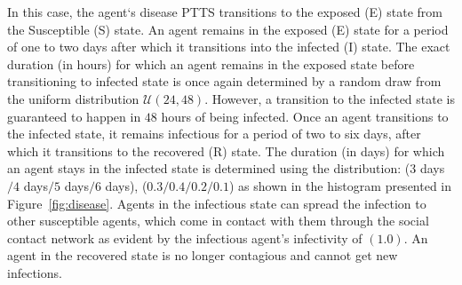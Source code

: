\documentclass[doublespace]{VTthesis}
\begin{document}
    In this case, the agent`s disease PTTS transitions to the exposed (E) state from the Susceptible (S) state. An agent remains in the exposed (E) state for a period of one to two days after which it transitions into the infected (I) state. The exact duration (in hours) for which an agent remains in the exposed state before transitioning to infected state is once again determined by a random draw from the uniform distribution $\mathcal{U}(24,48)$. However, a transition to the infected state is guaranteed to happen in $48$ hours of being infected. Once an agent transitions to the infected state, it remains infectious for a period of two to six days, after which it transitions to the recovered (R) state. The duration (in days) for which an agent stays in the infected state is determined using the distribution: ($3$ days$/4$ days$/5$ days$/6$ days), ($0.3/0.4/0.2/0.1$) as shown in the histogram presented in Figure~\ref{fig:disease}. Agents in the infectious state can spread the infection to other susceptible agents, which come in contact with them through the social contact network as evident by the infectious agent's infectivity of $(1.0)$. An agent in the recovered state is no longer contagious and cannot get new infections.
    
\end{document}
